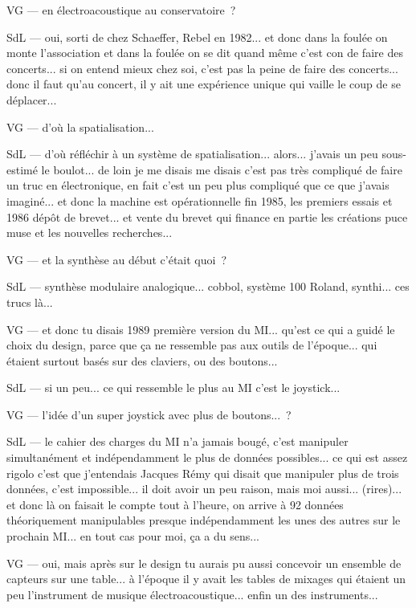 VG — en électroacoustique au conservatoire ? 

SdL — oui, sorti de chez Schaeffer, Rebel en 1982... et donc dans la foulée on monte l'association et dans la foulée on se dit quand même c'est con de faire des concerts... si on entend mieux chez soi, c'est pas la peine de faire des concerts... donc il faut qu'au concert, il y ait une expérience unique qui vaille le coup de se déplacer... 

VG — d'où la spatialisation... 

SdL — d'où réfléchir à un système de spatialisation... alors... j'avais un peu sous-estimé le boulot... de loin je me disais  me disais c'est pas très compliqué de faire un truc en électronique, en fait c'est un peu plus compliqué que ce que j'avais imaginé... et donc la machine est opérationnelle fin 1985, les premiers essais et 1986 dépôt de brevet... et vente du brevet qui finance en partie les créations puce muse et les nouvelles recherches...  

VG — et la synthèse au début c'était quoi ? 

SdL — synthèse modulaire analogique... cobbol, système 100 Roland, synthi... ces trucs là... 

VG — et donc tu disais 1989 première version du MI... qu'est ce qui a guidé le choix du design, parce que ça ne ressemble pas aux outils de l'époque... qui étaient surtout basés sur des claviers, ou des boutons... 

SdL — si un peu... ce qui ressemble le plus au MI c'est le joystick... 

VG — l'idée d'un super joystick avec plus de boutons... ? 

SdL — le cahier des charges du MI n'a jamais bougé, c'est manipuler simultanément et indépendamment le plus de données possibles... ce qui est assez rigolo c'est que j'entendais Jacques Rémy qui disait que manipuler plus de trois données, c'est impossible... il doit avoir un peu raison, mais moi aussi... (rires)... et donc là on faisait le compte tout à l'heure, on arrive à 92 données théoriquement manipulables presque indépendamment les unes des autres sur le prochain MI... en tout cas pour moi, ça a du sens...  

VG — oui, mais après sur le design tu aurais pu aussi concevoir un ensemble de capteurs sur une table... à l'époque il y avait les tables de mixages qui étaient un peu l'instrument de musique électroacoustique... enfin un des instruments... 

